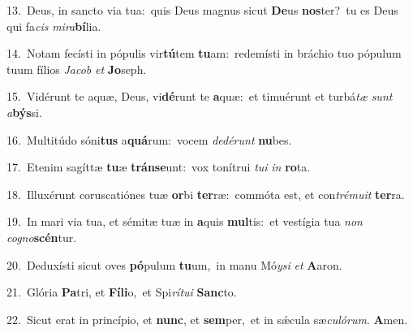 {\numbfont\textcolor{\numbcolor}{13.}}~Deus, in sancto via tua:~\dagger quis Deus magnus sicut \textbf{De}\-us \textbf{nos}\-ter?~\star tu es Deus qui fa\textit{cis} \textit{mi}\-\textit{ra}\textbf{bí}lia.\par
{\numbfont\textcolor{\numbcolor}{14.}}~Notam fecísti in pópulis vir\-\textbf{tú}\-tem \textbf{tu}\-am:~\star redemísti in bráchio tuo pópulum tuum fílios \textit{Ja}\-\textit{cob} \textit{et} \textbf{Jo}\-seph.\par
{\numbfont\textcolor{\numbcolor}{15.}}~Vidérunt te aquæ, Deus, vi\-\textbf{dé}\-runt te \textbf{a}\-quæ:~\star et timuérunt et turbá\textit{tæ} \textit{sunt} \textit{a}\-\textbf{býs}si.\par
{\numbfont\textcolor{\numbcolor}{16.}}~Multitúdo sóni\textbf{tus} a\-\textbf{quá}\-rum:~\star vocem \textit{de}\-\textit{dé}\textit{runt} \textbf{nu}\-bes.\par
{\numbfont\textcolor{\numbcolor}{17.}}~Etenim sagíttæ \textbf{tu}\-æ \textbf{tráns}\-\textbf{e}unt:~\star vox tonítrui \textit{tu}\-\textit{i} \textit{in} \textbf{ro}\-ta.\par
{\numbfont\textcolor{\numbcolor}{18.}}~Illuxérunt coruscatiónes tuæ \textbf{or}\-bi \textbf{ter}\-ræ:~\star commóta est, et con\-\textit{tré}\-\textit{mu}\textit{it} \textbf{ter}\-ra.\par
{\numbfont\textcolor{\numbcolor}{19.}}~In mari via tua, et sémitæ tuæ in \textbf{a}\-quis \textbf{mul}\-tis:~\star et vestígia tua \textit{non} \textit{co}\-\textit{gno}\textbf{scén}tur.\par
{\numbfont\textcolor{\numbcolor}{20.}}~Deduxísti sicut oves \textbf{pó}\-pulum \textbf{tu}\-um,~\star in manu Mó\-\textit{y}\-\textit{si} \textit{et} \textbf{A}\-aron.\par
{\numbfont\textcolor{\numbcolor}{21.}}~Glória \textbf{Pa}\-tri, et \textbf{Fí}\-\textbf{li}o,~\star et Spi\-\textit{rí}\-\textit{tu}\textit{i} \textbf{Sanc}\-to.\par
{\numbfont\textcolor{\numbcolor}{22.}}~Sicut erat in princípio, et \textbf{nunc}\-, et \textbf{sem}\-per,~\star et in sǽcula sæ\-\textit{cu}\-\textit{ló}\textit{rum}. \textbf{A}\-men.\par
